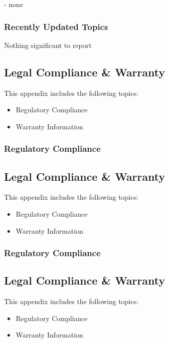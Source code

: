 \documentclass[letterpaper,10pt,english]{sphinxmanual}
\begin{document}
 - none


\subsubsection{Recently Updated Topics}
\label{\detokenize{releasenotes:recently-updated-topics}}
Nothing significant to report


\subsection{Legal Compliance \& Warranty}
\label{\detokenize{abstract:legal-compliance-warranty}}\label{\detokenize{abstract::doc}}
This appendix includes the following topics:
\begin{itemize}
\item {} 
Regulatory Compliance

\item {} 
Warranty Information

\end{itemize}


\subsubsection{Regulatory Compliance}
\label{\detokenize{abstract:regulatory-compliance}}

\subsection{Legal Compliance \& Warranty}
\label{\detokenize{why:legal-compliance-warranty}}\label{\detokenize{why::doc}}
This appendix includes the following topics:
\begin{itemize}
\item {} 
Regulatory Compliance

\item {} 
Warranty Information

\end{itemize}


\subsubsection{Regulatory Compliance}
\label{\detokenize{why:regulatory-compliance}}

\subsection{Legal Compliance \& Warranty}
\label{\detokenize{overview:legal-compliance-warranty}}\label{\detokenize{overview::doc}}
This appendix includes the following topics:
\begin{itemize}
\item {} 
Regulatory Compliance

\item {} 
Warranty Information

\end{itemize}
\end{document}
